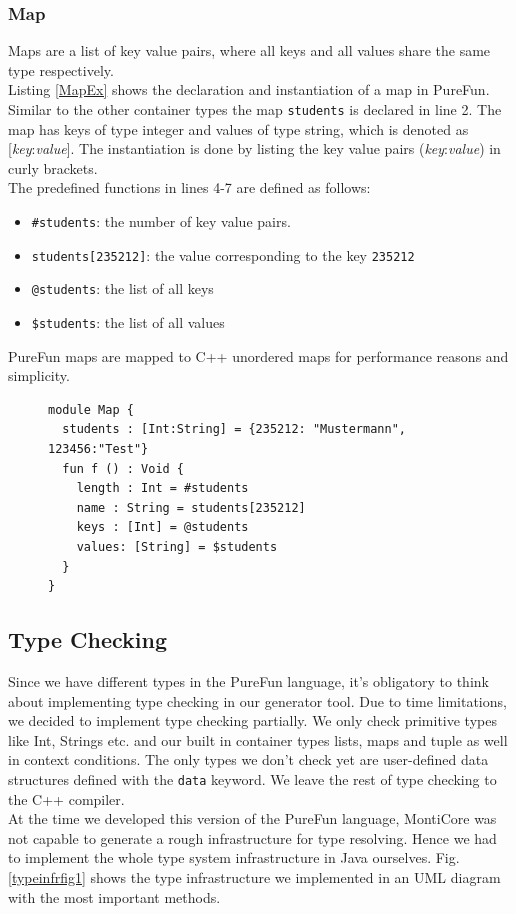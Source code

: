 \subsubsection{Map}
Maps are a list of key value pairs, where all keys and all values share the same type respectively.\\
Listing \ref{MapEx} shows the declaration and instantiation of a map in PureFun. Similar to the other container types the map \texttt{students} is declared in line 2. The map has keys of type integer and values of type string, which is denoted as [\textit{key}:\textit{value}]. The instantiation is done by listing the key value pairs (\textit{key}:\textit{value}) in curly brackets.\\
The predefined functions in lines 4-7 are defined as follows:
\begin{itemize}
\item \texttt{\#students}: the number of key value pairs.
\item \texttt{students[235212]}: the value corresponding to the key \texttt{235212}
\item \texttt{@students}: the list of all keys
\item \texttt{\$students}: the list of all values
\end{itemize}
PureFun maps are mapped to C++ unordered maps for performance reasons and simplicity.
\begin{figure}
\begin{lstlisting}[caption={PureFun code with a map and its predefined functions.},label={MapEx}]
module Map {
  students : [Int:String] = {235212: "Mustermann", 123456:"Test"}
  fun f () : Void {
    length : Int = #students
    name : String = students[235212]
    keys : [Int] = @students
    values: [String] = $students
  }
}
\end{lstlisting}
\end{figure}
\subsection{Type Checking}

Since we have different types in the PureFun language, it's obligatory to think about implementing type checking in our generator tool. Due to time limitations, we decided to implement type checking partially. We only check primitive types like Int, Strings etc. and our built in container types lists, maps and tuple as well in context conditions. The only types we don't check yet are user-defined data structures defined with the \texttt{data} keyword. We leave the rest of type checking to the C++ compiler.\\
At the time we developed this version of the PureFun language, MontiCore was not capable to generate a rough infrastructure for type resolving. Hence we had to implement the whole type system infrastructure in Java ourselves. Fig. \ref{typeinfrfig1} shows the type infrastructure we implemented in an UML diagram with the most important methods.

